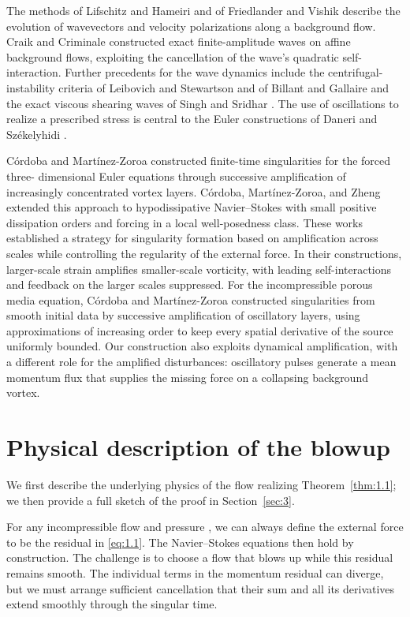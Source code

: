 The methods of Lifschitz and Hameiri and of Friedlander and Vishik \cite{ref-17,ref-14} describe
the evolution of wavevectors and velocity polarizations along a background flow. Craik
and Criminale \cite{ref-9} constructed exact finite-amplitude waves on affine background flows,
exploiting the cancellation of the wave's quadratic self-interaction. Further precedents for the
wave dynamics include the centrifugal-instability criteria of Leibovich and Stewartson \cite{ref-15}
and of Billant and Gallaire \cite{ref-2,ref-3} and the exact viscous shearing waves of Singh and Sridhar
\cite{ref-19}. The use of oscillations to realize a prescribed stress is central to the Euler constructions
of Daneri and Székelyhidi \cite{ref-10}.

Córdoba and Martínez-Zoroa \cite{ref-6} constructed finite-time singularities for the forced three-
dimensional Euler equations through successive amplification of increasingly concentrated
vortex layers. Córdoba, Martínez-Zoroa, and Zheng \cite{ref-8} extended this approach to hypodissipative
Navier--Stokes with small positive dissipation orders and forcing in a local
well-posedness class. These works established a strategy for singularity formation based on
amplification across scales while controlling the regularity of the external force. In their constructions,
larger-scale strain amplifies smaller-scale vorticity, with leading self-interactions
and feedback on the larger scales suppressed. For the incompressible porous media equation,
Córdoba and Martínez-Zoroa \cite{ref-7} constructed singularities from smooth initial data by successive
amplification of oscillatory layers, using approximations of increasing order to keep
every spatial derivative of the source uniformly bounded. Our construction also exploits
%
dynamical amplification, with a different role for the amplified disturbances: oscillatory
pulses generate a mean momentum flux that supplies the missing force on a collapsing
background vortex.

\section{Physical description of the blowup}\label{sec:2}

We first describe the underlying physics of the flow realizing Theorem~\ref{thm:1.1}; we then provide
a full sketch of the proof in Section~\ref{sec:3}.

For any incompressible flow  and pressure , we can always define the external force
 to be the residual in \eqref{eq:1.1}. The Navier--Stokes equations then hold by construction. The
challenge is to choose a flow that blows up while this residual remains smooth. The
individual terms in the momentum residual can diverge, but we must arrange sufficient
cancellation that their sum and all its derivatives extend smoothly through the singular time.

